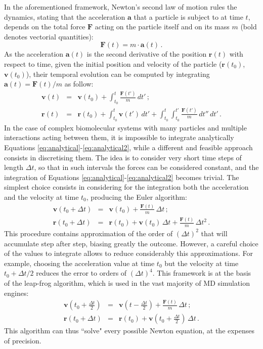 In the aforementioned framework, Newton's second law of motion rules the dynamics, stating that the acceleration $\textbf{a}$ that a particle is subject to at time $t$, depends on the total force $\textbf{F}$ acting on the particle itself and on its mass $m$ (bold denotes vectorial quantities):
\begin{equation} \label{eq:newton}
\textbf{F}(t) =  m \cdot \textbf{a}(t) \, .
\end{equation}
As the acceleration $\textbf{a}(t)$ is the second derivative of the position $\textbf{r}(t)$ with respect to time, given the initial position and velocity of the particle ($\textbf{r}(t_0)$, $\textbf{v}(t_0)$), their temporal evolution can be computed by integrating $\textbf{a}(t) = \textbf{F}(t)/m$ as follow:
\begin{eqnarray} \label{eq:analytical}
\mathbf{v}(t) &=& \mathbf{v}(t_0) + \int_{t_0}^t \frac{\mathbf{F}(t')}{m} \, dt' \, ; \\
\mathbf{r}(t) &=& \mathbf{r}(t_0) + \int_{t_0}^t \mathbf{v}(t') \, dt' + \int_{t_0}^t \int_{t_0}^{t'} \frac{\mathbf{F}(t')}{m} \, dt'' \, dt'\, . \label{eq:analytical2}
\end{eqnarray}
%
In the case of complex biomolecular systems with many particles and multiple interactions acting between them, it is impossible to integrate analytically Equations \ref{eq:analytical}-\ref{eq:analytical2}, while a different and feasible approach consists in discretising them.
%
The idea is to consider very short time steps of length $\Delta t$, so that in such intervals the forces can be considered constant, and the integration of Equations \ref{eq:analytical}-\ref{eq:analytical2} becomes trivial.
%
The simplest choice consists in considering for the integration both the acceleration and the velocity at time $t_0$, producing the Euler algorithm:
\begin{eqnarray} \label{eq:euler}
\mathbf{v}(t_0 + \Delta t) &=& \mathbf{v}(t_0) + \frac{\mathbf{F}(t)}{m} \, \Delta t \,; \\
\mathbf{r}(t_0 + \Delta t) &=& \mathbf{r}(t_0) + \mathbf{v}(t_0) \, \Delta t + \frac{\mathbf{F}(t)}{m} \, \Delta t^2 \,. \label{eq:euler2}
\end{eqnarray}
%
This procedure contains approximation of the order of $(\Delta t)^2$ that will accumulate step after step, biasing greatly the outcome. However, a careful choice of the values to integrate allows to reduce considerably this approximations. For example, choosing the acceleration value at time $t_0$ but the velocity at time $t_0 + \Delta t/2$ reduces the error to orders of $(\Delta t)^4$. This framework is at the basis of the leap-frog algorithm, which is used in the vast majority of MD simulation engines:
\begin{eqnarray}
\mathbf{v}\left(t_0 + \frac{\Delta t}{2}\right) &=& \mathbf{v}\left(t - \frac{\Delta t}{2}\right) + \frac{\mathbf{F}(t)}{m} \, \Delta t \, ; \\
\mathbf{r}(t_0 + \Delta t) &=& \mathbf{r}(t_0) + \mathbf{v}\left(t_0 + \frac{\Delta t}{2}\right) \, \Delta t \, .
\end{eqnarray}
This algorithm can thus ``solve" every possible Newton equation, at the expenses of precision.


